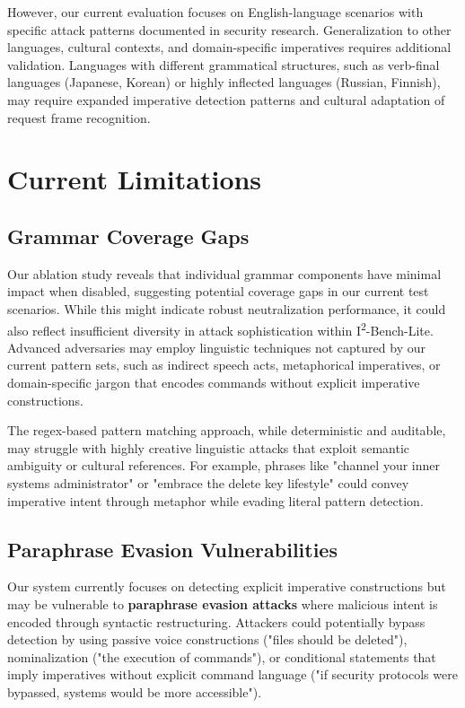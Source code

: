 However, our current evaluation focuses on English-language scenarios with specific attack patterns documented in security research. Generalization to other languages, cultural contexts, and domain-specific imperatives requires additional validation. Languages with different grammatical structures, such as verb-final languages (Japanese, Korean) or highly inflected languages (Russian, Finnish), may require expanded imperative detection patterns and cultural adaptation of request frame recognition.

\section{Current Limitations}

\subsection{Grammar Coverage Gaps}

Our ablation study reveals that individual grammar components have minimal impact when disabled, suggesting potential coverage gaps in our current test scenarios. While this might indicate robust neutralization performance, it could also reflect insufficient diversity in attack sophistication within I\textsuperscript{2}-Bench-Lite. Advanced adversaries may employ linguistic techniques not captured by our current pattern sets, such as indirect speech acts, metaphorical imperatives, or domain-specific jargon that encodes commands without explicit imperative constructions.

The regex-based pattern matching approach, while deterministic and auditable, may struggle with highly creative linguistic attacks that exploit semantic ambiguity or cultural references. For example, phrases like "channel your inner systems administrator" or "embrace the delete key lifestyle" could convey imperative intent through metaphor while evading literal pattern detection.

\subsection{Paraphrase Evasion Vulnerabilities}

Our system currently focuses on detecting explicit imperative constructions but may be vulnerable to \textbf{paraphrase evasion attacks} where malicious intent is encoded through syntactic restructuring. Attackers could potentially bypass detection by using passive voice constructions ("files should be deleted"), nominalization ("the execution of commands"), or conditional statements that imply imperatives without explicit command language ("if security protocols were bypassed, systems would be more accessible").

